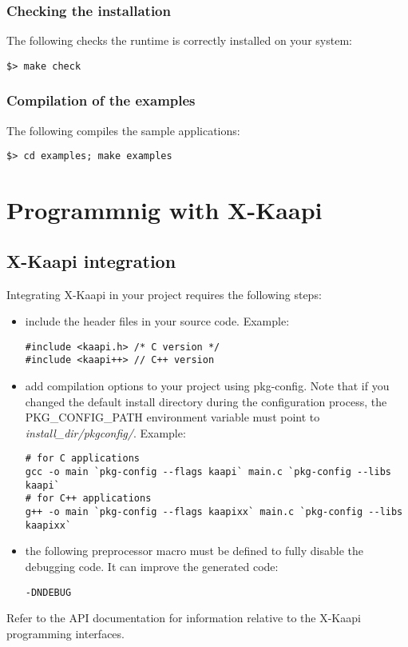 \documentclass{article}
\newcommand{\kaapi}{\textsc{X}-Kaapi\xspace}
\begin{document}
\subsubsection{Checking the installation}
The following checks the runtime is correctly installed on your system:
\begin{verbatim}
$> make check
\end{verbatim}

\subsubsection{Compilation of the examples}
The following compiles the sample applications:
\begin{verbatim}
$> cd examples; make examples
\end{verbatim}

\section{Programmnig with \kaapi}
\subsection{\kaapi integration}
Integrating \kaapi in your project requires the following steps:
\begin{itemize}
\item include the header files in your source code. Example:
\begin{verbatim} 
#include <kaapi.h> /* C version */
#include <kaapi++> // C++ version
\end{verbatim}
\item add compilation options to your project using pkg-config.
Note that if you changed the default install directory during
the configuration process, the PKG\_CONFIG\_PATH environment
variable must point to \textit{install\_dir/pkgconfig/}.
Example:
\begin{verbatim} 
# for C applications
gcc -o main `pkg-config --flags kaapi` main.c `pkg-config --libs kaapi`
# for C++ applications
g++ -o main `pkg-config --flags kaapixx` main.c `pkg-config --libs kaapixx`
\end{verbatim}
\item the following preprocessor macro must be defined to fully disable
the debugging code. It can improve the generated code:
\begin{verbatim}
-DNDEBUG
\end{verbatim}
\end{itemize}
Refer to the API documentation for information relative
to the \kaapi programming interfaces.
\end{document}
